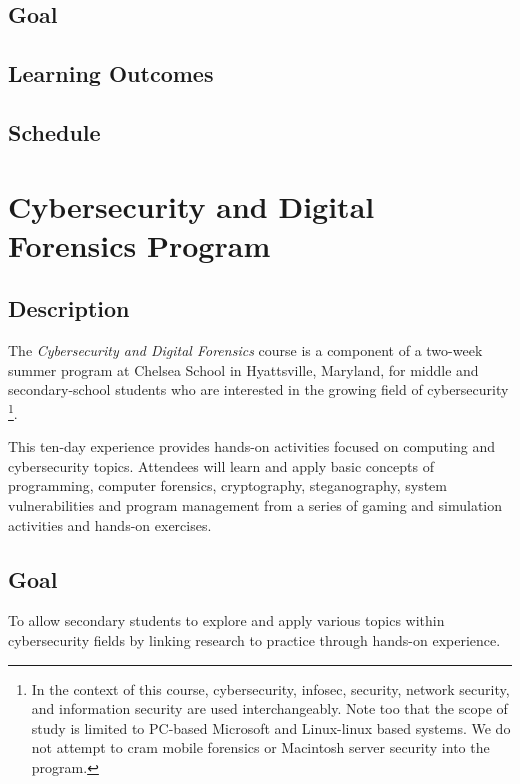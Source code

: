\documentclass[letterpaper,10pt,english]{sphinxmanual}
\begin{document}
\section{Goal}
\label{arts:goal}

\section{Learning Outcomes}
\label{arts:learning-outcomes}

\section{Schedule}
\label{arts:schedule}

\chapter{Cybersecurity and Digital Forensics Program}
\label{cybersecurity::doc}\label{cybersecurity:cybersecurity-and-digital-forensics-program}

\section{Description}
\label{cybersecurity:description}
The \emph{Cybersecurity and Digital Forensics} course is a component of a two-week summer program at Chelsea School in Hyattsville, Maryland, for middle and secondary-school students who are interested in the growing field of cybersecurity \footnote{
In the context of this course, cybersecurity, infosec, security, network security, and information security are used interchangeably. Note too that the scope of study is limited to PC-based Microsoft and Linux-linux based systems. We do not attempt to cram mobile forensics or Macintosh server security into the program.
}.

This ten-day experience provides hands-on activities focused on computing and cybersecurity topics. Attendees will learn and apply basic concepts of programming, computer forensics, cryptography, steganography, system vulnerabilities and program management from a series of gaming and simulation activities and hands-on exercises.


\section{Goal}
\label{cybersecurity:goal}
To allow secondary students to explore and apply various topics within cybersecurity fields by linking research to practice through hands-on experience.
\end{document}
